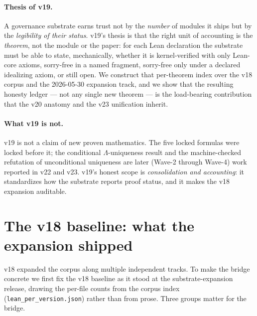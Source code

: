 \documentclass[11pt]{article}
\theoremstyle{plain}
\theoremstyle{definition}
\theoremstyle{remark}
\newcommand{\La}{\Lambda}
\begin{document}
\paragraph{Thesis of v19.}
A governance substrate earns trust not by the \emph{number} of modules it ships but by
the \emph{legibility of their status}. v19's thesis is that the right unit of
accounting is the \emph{theorem}, not the module or the paper: for each Lean
declaration the substrate must be able to state, mechanically, whether it is
kernel-verified with only Lean-core axioms, sorry-free in a named fragment,
sorry-free only under a declared idealizing axiom, or still open. We construct that
per-theorem index over the v18 corpus and the 2026-05-30 expansion track, and we show
that the resulting honesty ledger --- not any single new theorem --- is the load-bearing
contribution that the v20 anatomy and the v23 unification inherit.

\paragraph{What v19 is not.}
v19 is not a claim of new proven mathematics. The five locked formulas were locked
before it; the conditional $\La$-uniqueness result and the machine-checked refutation
of unconditional uniqueness are later (Wave-2 through Wave-4) work reported in v22 and
v23. v19's honest scope is \emph{consolidation and accounting}: it standardizes how the
substrate reports proof status, and it makes the v18 expansion auditable.

\section{The v18 baseline: what the expansion shipped}
\label{sec:v18}

v18 expanded the corpus along multiple independent tracks. To make the bridge concrete
we first fix the v18 baseline as it stood at the substrate-expansion release, drawing
the per-file counts from the corpus index (\texttt{lean\_per\_version.json}) rather than
from prose. Three groups matter for the bridge.
\end{document}
